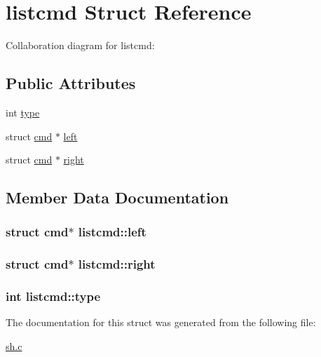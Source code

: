 \hypertarget{structlistcmd}{}\section{listcmd Struct Reference}
\label{structlistcmd}


Collaboration diagram for listcmd\+:
\subsection*{Public Attributes}
\begin{DoxyCompactItemize}
\item 
int \hyperlink{structlistcmd_a2db395eea2aa2323b521cd272c6ccc23}{type}
\item 
struct \hyperlink{structcmd}{cmd} $\ast$ \hyperlink{structlistcmd_a3058dfa06817a015f821d38f1e1edc3b}{left}
\item 
struct \hyperlink{structcmd}{cmd} $\ast$ \hyperlink{structlistcmd_a063a3a59362ddfafb7c0e4c848d4e8c5}{right}
\end{DoxyCompactItemize}


\subsection{Member Data Documentation}
\subsubsection[{\texorpdfstring{left}{left}}]{\setlength{\rightskip}{0pt plus 5cm}struct {\bf cmd}$\ast$ listcmd\+::left}\hypertarget{structlistcmd_a3058dfa06817a015f821d38f1e1edc3b}{}\label{structlistcmd_a3058dfa06817a015f821d38f1e1edc3b}
\subsubsection[{\texorpdfstring{right}{right}}]{\setlength{\rightskip}{0pt plus 5cm}struct {\bf cmd}$\ast$ listcmd\+::right}\hypertarget{structlistcmd_a063a3a59362ddfafb7c0e4c848d4e8c5}{}\label{structlistcmd_a063a3a59362ddfafb7c0e4c848d4e8c5}
\subsubsection[{\texorpdfstring{type}{type}}]{\setlength{\rightskip}{0pt plus 5cm}int listcmd\+::type}\hypertarget{structlistcmd_a2db395eea2aa2323b521cd272c6ccc23}{}\label{structlistcmd_a2db395eea2aa2323b521cd272c6ccc23}


The documentation for this struct was generated from the following file\+:\begin{DoxyCompactItemize}
\item 
\hyperlink{sh_8c}{sh.\+c}\end{DoxyCompactItemize}
